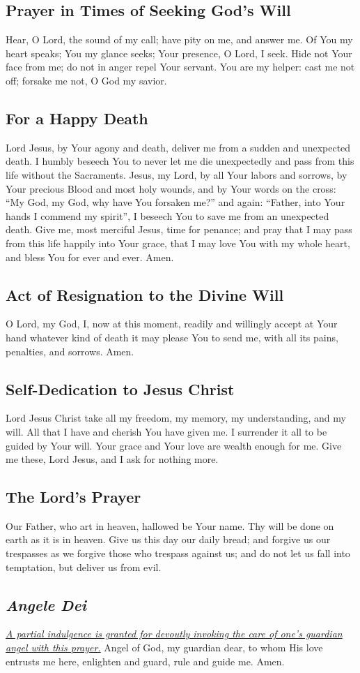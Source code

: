 \documentclass[12pt]{article}
\newcommand{\prayertitle}[1]{\subsection{#1}}
\newcommand{\indulgencedprayertitle}[1]{\prayertitle{#1 \protect\kreuz}}
\newcommand{\foreign}[1]{\textsl{#1}}
\newcommand{\note}[1]{{\small{\textsl{#1}}}\newline}
\newcommand{\linkednote}[2]{\hyperlink{#1}{\note{#2}}}
\begin{document}
\prayertitle{Prayer in Times of Seeking God's Will}
Hear, O Lord, the sound of my call;
have pity on me, and answer me.
Of You my heart speaks;
You my glance seeks;
Your presence, O Lord, I seek.
Hide not Your face from me; 
do not in anger repel Your servant.
You are my helper: cast me not off;
forsake me not, O God my savior.

\prayertitle{For a Happy Death}
Lord Jesus, by Your agony and death, deliver me from a sudden and unexpected death.
I humbly beseech You to never let me die unexpectedly and pass from this life without the Sacraments.
Jesus, my Lord, by all Your labors and sorrows, by Your precious Blood and most holy wounds, and by Your words on the cross:
``My God, my God, why have You forsaken me?''
and again:
``Father, into Your hands I commend my spirit'',
I beseech You to save me from an unexpected death.
Give me, most merciful Jesus, time for penance;
and pray that I may pass from this life happily into Your grace, that I may love You with my whole heart, and bless You for ever and ever.
Amen.

\prayertitle{Act of Resignation to the Divine Will}
O Lord, my God, I, now at this moment, readily and willingly accept at Your hand whatever kind of death it may please You to send me, with all its pains, penalties, and sorrows.
Amen.

\prayertitle{Self-Dedication to Jesus Christ}
Lord Jesus Christ take all my freedom, my memory, my understanding, and my will.
All that I have and cherish You have given me.
I surrender it all to be guided by Your will.
Your grace and Your love are wealth enough for me.
Give me these, Lord Jesus, and I ask for nothing more.

\prayertitle{The Lord's Prayer}
Our Father, who art in heaven, hallowed be Your name.
Thy will be done on earth as it is in heaven.
Give us this day our daily bread;
and forgive us our trespasses as we forgive those who trespass against us;
and do not let us fall into temptation, but deliver us from evil.

\indulgencedprayertitle{\foreign{Angele Dei}}
\linkednote{grant18}{A partial indulgence is granted for devoutly invoking the care of one's guardian angel with this prayer.}
Angel of God, my guardian dear, to whom His love entrusts me here, enlighten and guard, rule and guide me. Amen.
\end{document}
